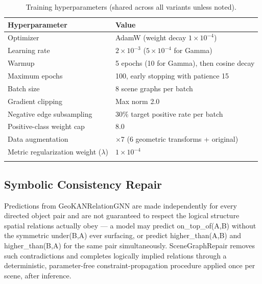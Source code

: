 \documentclass[sn-mathphys,Numbered]{sn-jnl}
\begin{document}
\begin{table}[htbp]
\centering
\caption{Training hyperparameters (shared across all variants unless noted).}\label{tab6}
\begin{tabular}{@{}ll@{}}
\toprule
Hyperparameter & Value \\
\midrule
Optimizer & AdamW (weight decay $1\times10^{-4}$) \\
\midrule
Learning rate & $2\times10^{-3}$ ($5\times10^{-4}$ for Gamma) \\
\midrule
Warmup & 5 epochs (10 for Gamma), then cosine decay \\
\midrule
Maximum epochs & 100, early stopping with patience 15 \\
\midrule
Batch size & 8 scene graphs per batch \\
\midrule
Gradient clipping & Max norm 2.0 \\
\midrule
Negative edge subsampling & 30\% target positive rate per batch \\
\midrule
Positive-class weight cap & 8.0 \\
\midrule
Data augmentation & $\times$7 (6 geometric transforms + original) \\
\midrule
Metric regularization weight ($\lambda$) & $1\times10^{-4}$ \\
\botrule
\end{tabular}
\end{table}

\FloatBarrier
\subsection{Symbolic Consistency Repair}\label{subsec4-8}

Predictions from GeoKANRelationGNN are made independently for every directed object pair and are not guaranteed to respect the logical structure spatial relations actually obey --- a model may predict on\_top\_of(A,B) without the symmetric under(B,A) ever surfacing, or predict higher\_than(A,B) and higher\_than(B,A) for the same pair simultaneously. SceneGraphRepair removes such contradictions and completes logically implied relations through a deterministic, parameter-free constraint-propagation procedure applied once per scene, after inference.
\end{document}
